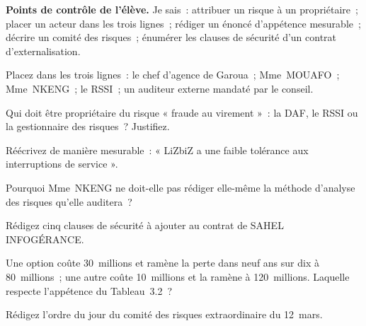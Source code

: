 \begin{boxinfo}
\textbf{Points de contrôle de l'élève.} Je sais~: attribuer un risque à un
propriétaire~; placer un acteur dans les trois lignes~; rédiger un énoncé
d'appétence mesurable~; décrire un comité des risques~; énumérer les
clauses de sécurité d'un contrat d'externalisation.
\end{boxinfo}

\bigskip

\begin{boxexo}[title={\ding{45}\quad Exercice~3.1. Quelle ligne~? \niveaubase}]
Placez dans les trois lignes~: le chef d'agence de Garoua~; Mme~MOUAFO~;
Mme~NKENG~; le RSSI~; un auditeur externe mandaté par le conseil.
\end{boxexo}

\begin{boxexo}[title={\ding{45}\quad Exercice~3.2. Le propriétaire \niveaubase}]
Qui doit être propriétaire du risque « fraude au virement »~: la DAF, le
RSSI ou la gestionnaire des risques~? Justifiez.
\end{boxexo}

\begin{boxexo}[title={\ding{45}\quad Exercice~3.3. Mesurable \niveaubase}]
Réécrivez de manière mesurable~: « LiZbiZ a une faible tolérance aux
interruptions de service ».
\end{boxexo}

\begin{boxexo}[title={\ding{45}\quad Exercice~3.4. Indépendance \niveaumoyen}]
Pourquoi Mme~NKENG ne doit-elle pas rédiger elle-même la méthode d'analyse
des risques qu'elle auditera~?
\end{boxexo}

\begin{boxexo}[title={\ding{45}\quad Exercice~3.5. Le contrat \niveaumoyen}]
Rédigez cinq clauses de sécurité à ajouter au contrat de SAHEL
INFOGÉRANCE.
\end{boxexo}

\begin{boxexo}[title={\ding{45}\quad Exercice~3.6. Appétence et décision \niveaumoyen}]
Une option coûte 30~millions et ramène la perte dans neuf ans sur dix à
80~millions~; une autre coûte 10~millions et la ramène à 120~millions.
Laquelle respecte l'appétence du Tableau~3.2~?
\end{boxexo}

\begin{boxexo}[title={\ding{45}\quad Exercice~3.7. L'ordre du jour \niveaumoyen}]
Rédigez l'ordre du jour du comité des risques extraordinaire du 12~mars.
\end{boxexo}

